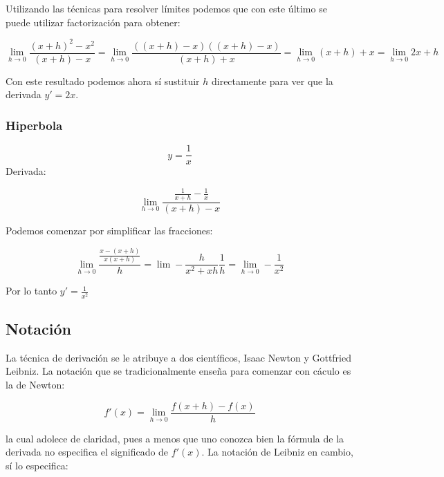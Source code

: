 \documentclass[
]{book}
\begin{document}
Utilizando las técnicas para resolver límites podemos que con este último se puede utilizar factorización para obtener:

\begin{equation}
\lim \limits_{h \rightarrow 0} \frac{(x + h)^2 - x^2}{(x+h) - x} = \lim \limits_{h \rightarrow 0} \frac{((x + h) - x)((x + h) - x)}{(x + h) + x} = \lim \limits_{h \rightarrow 0} (x + h) + x = \lim \limits_{h \rightarrow 0} 2x + h
\end{equation}

Con este resultado podemos ahora sí sustituir \(h\) directamente para ver que la derivada \(y' = 2x\).

\hypertarget{hiperbola}{%
\subsubsection{Hiperbola}\label{hiperbola}}

\[ y = \frac{1}{x}\]
Derivada:

\begin{equation}
\lim \limits_{h \rightarrow 0} \frac{\frac{1}{x + h} - \frac{1}{x}}{(x+h) - x}
\end{equation}

Podemos comenzar por simplificar las fracciones:

\begin{equation}
\lim \limits_{h \rightarrow 0} \frac{\frac{x - (x + h)}{x(x + h)}}{h} = \lim \limits - \frac{h}{x^2 + xh} \frac{1}{h} = \lim \limits_{h \rightarrow 0} -\frac{1}{x^2}
\end{equation}

Por lo tanto \(y' = \frac{1}{x^2}\)

\hypertarget{notaciuxf3n}{%
\subsection{Notación}\label{notaciuxf3n}}

La técnica de derivación se le atribuye a dos científicos, Isaac Newton y Gottfried Leibniz. La notación que se tradicionalmente enseña para comenzar con cáculo es la de Newton:

\begin{equation}
f'(x) = \lim \limits_{h \rightarrow 0} \frac{f(x + h) - f(x)}{h} \label{eq:Newton}
\end{equation}

la cual adolece de claridad, pues a menos que uno conozca bien la fórmula de la derivada no especifica el significado de \(f'(x)\). La notación de Leibniz en cambio, sí lo especifica:
\end{document}
